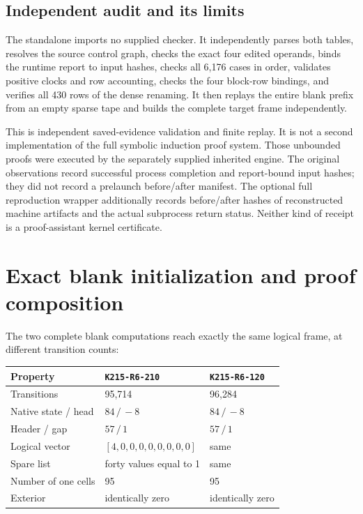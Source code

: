 \documentclass[11pt,a4paper]{article}
\theoremstyle{remark}\newtheorem{remark}[theorem]{Remark}
\newcommand{\file}[1]{\path{#1}}
\newcommand{\rhoa}{\texttt{K215-R6-210}}
\newcommand{\rhob}{\texttt{K215-R6-120}}
\begin{document}
\subsection{Independent audit and its limits}

The standalone \file{code/audit_candidate.py} imports no supplied
checker. It independently parses both tables, resolves the source
control graph, checks the exact four edited operands, binds the runtime
report to input hashes, checks all 6,176 cases in order, validates
positive clocks and row accounting, checks the four block-row bindings,
and verifies all 430 rows of the dense renaming. It then replays the
entire blank prefix from an empty sparse tape and builds the complete
target frame independently.

This is independent saved-evidence validation and finite replay. It is
not a second implementation of the full symbolic induction proof
system. Those unbounded proofs were executed by the separately supplied
inherited engine. The original observations record successful process
completion and report-bound input hashes; they did not record a
prelaunch before/after manifest. The optional full reproduction wrapper
additionally records before/after hashes of reconstructed machine
artifacts and the actual subprocess return status. Neither kind of
receipt is a proof-assistant kernel certificate.

\section{Exact blank initialization and proof composition}

The two complete blank computations reach exactly the same logical
frame, at different transition counts:
\begin{center}
\begin{tabular}{@{}lll@{}}
\toprule
Property & \rhoa & \rhob\\
\midrule
Transitions & 95,714 & 96,284\\
Native state / head & $84\,/\,-8$ & $84\,/\,-8$\\
Header / gap & $57\,/\,1$ & $57\,/\,1$\\
Logical vector & $[4,0,0,0,0,0,0,0,0]$ & same\\
Spare list & forty values equal to 1 & same\\
Number of one cells & 95 & 95\\
Exterior & identically zero & identically zero\\
\bottomrule
\end{tabular}
\end{center}
\end{document}
